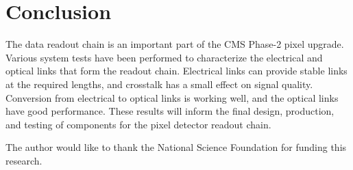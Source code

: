 \documentclass[a4paper,11pt]{article}
\begin{document}
\section{Conclusion}
\label{sec:conclusion}

The data readout chain is an important part of the CMS Phase-2 pixel upgrade.
Various system tests have been performed to characterize the electrical and optical links that form the readout chain.
Electrical links can provide stable links at the required lengths, and crosstalk has a small effect on signal quality.
Conversion from electrical to optical links is working well, and the optical links have good performance.
These results will inform the final design, production, and testing of components for the pixel detector readout chain.


\acknowledgments

The author would like to thank the National Science Foundation for funding this research.

\end{document}
